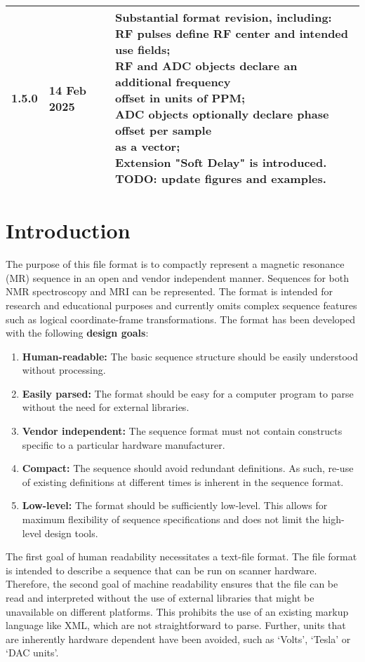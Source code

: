 \documentclass{article}
\begin{document}
\begin{tabular}{lll}
1.5.0 & 14 Feb 2025 & \makecell{Substantial format revision, including: \\
RF pulses define RF center and intended use fields; \\
RF and ADC objects declare an additional frequency \\ offset in units of PPM; \\
ADC objects optionally declare phase offset per sample \\ as a vector; \\
Extension "Soft Delay" is introduced. \\
TODO: update figures and examples.  \\
} \\
\bottomrule
\end{tabular}


\section{Introduction}
The purpose of this file format is to compactly represent a magnetic resonance (MR) sequence in an open and vendor independent manner. Sequences for both NMR spectroscopy and MRI can be represented. The format is intended for research and educational purposes and currently omits complex sequence features such as logical coordinate-frame transformations. The format has been developed with the following \textbf{design goals}:
\begin{enumerate}
\item \textbf{Human-readable:} The basic sequence structure should be easily understood without processing.
\item \textbf{Easily parsed:} The format should be easy for a computer program to parse without the need for external libraries.
\item \textbf{Vendor independent:} The sequence format must not contain constructs specific to a particular hardware manufacturer.
\item \textbf{Compact:} The sequence should avoid redundant definitions. As such, re-use of existing definitions at different times is inherent in the sequence format.
\item \textbf{Low-level:} The format should be sufficiently low-level. This allows for maximum flexibility of sequence specifications and does not limit the high-level design tools.
\end{enumerate}

The first goal of human readability necessitates a text-file format. The file format is intended to describe a sequence that can be run on scanner hardware. Therefore, the second goal of machine readability ensures that the file can be read and interpreted without the use of external libraries that might be unavailable on different platforms. This prohibits the use of an existing markup language like XML, which are not straightforward to parse. Further, units  that are inherently hardware dependent have been avoided, such as `Volts', `Tesla' or  `DAC units'. 
\end{document}
